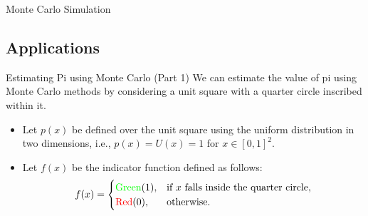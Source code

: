 \documentclass{beamer}
\begin{document}
\begin{section}{Monte Carlo Simulation}
        


    
    \subsection{Applications}
    \begin{frame}[fragile]{Estimating Pi using Monte Carlo (Part 1)}
        We can estimate the value of pi using Monte Carlo methods by considering a unit square with a quarter circle inscribed within it.
        
        \begin{itemize}
           \pause \item Let $p(x)$ be defined over the unit square using the uniform distribution in two dimensions, i.e., $p(x) = U(x) = 1$ for $x \in [0, 1]^2$.
            \pause \item Let $f(x)$ be the indicator function defined as follows:
                \[
                f(x) = \begin{cases}
                            \text{\textcolor{green}{Green}} (1), & \text{if } x \text{ falls inside the quarter circle}, \\
                            \text{\textcolor{red}{Red}} (0), & \text{otherwise}.
                       \end{cases}
                \]
        \end{itemize}
    \end{frame}


\end{section}
\end{document}
